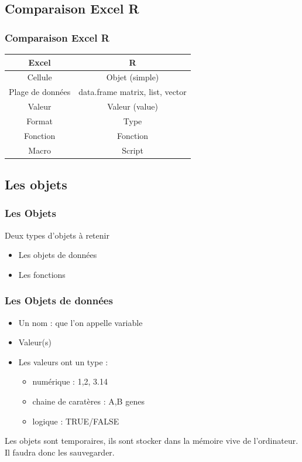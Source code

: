 \documentclass[table,svgnames,hyperref={pdfpagemode=FullScreen}]{beamer}
\begin{document}
\subsection{Comparaison Excel R}
\begin{frame}
	\frametitle{Comparaison Excel R}
	\begin{center}
{
	\begin{tabular}[h]{cc}
		\hline
		\textbf{Excel} &  \textbf{R} \pause\\
		\hline 
		
		Cellule & Objet (simple) \\
		Plage de données & data.frame matrix, list, vector \pause\\
		\hline
		Valeur & Valeur (value) \\
		Format & Type \pause\\
		\hline
		Fonction & Fonction \\
		Macro & Script \\
		\hline
	\end{tabular}}
	\end{center}
\end{frame}
\subsection{Les objets}
\begin{frame}
	\frametitle{Les Objets}
	\begin{exampleblock}{Deux types d'objets à retenir}
	\begin{itemize}
		\item Les objets de données
		\item Les fonctions
	\end{itemize}
	\end{exampleblock}
\end{frame}
\begin{frame}
	\frametitle{Les Objets de données}
	\begin{itemize}
		\item Un nom : que l'on appelle  variable
		\item Valeur(s)
		\item Les valeurs ont un type : 
			\begin{itemize}
				\item numérique : 1,2, 3.14
				\item chaine de caratères : A,B genes
				\item logique : TRUE/FALSE
			\end{itemize}
	\end{itemize}
	Les objets sont temporaires, ils sont stocker dans la mémoire vive de l'ordinateur. Il faudra donc les sauvegarder.
\end{frame}
\end{document}
